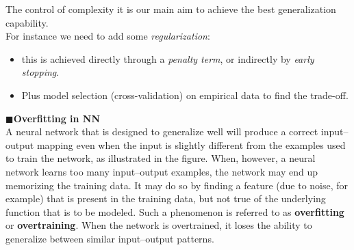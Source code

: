 \documentclass[../main.tex]{subfiles}
\begin{document}
\noindent The control of complexity it is our main aim to achieve the best generalization capability.\\
For instance we need to add some \emph{regularization}:
\begin{itemize}
    \item this is achieved directly through a \emph{penalty term}, or indirectly by \emph{early stopping}.
    \item Plus model selection (cross-validation) on empirical data to find the trade-off.
\end{itemize}

\noindent$\blacksquare$\textbf{Overfitting in NN}\\
\noindent A neural network that is designed to generalize well will produce a correct
input–output mapping even when the input is slightly different from the examples used
to train the network, as illustrated in the figure. When, however, a neural network learns too many input–output examples, the network may end up memorizing the training
data. It may do so by finding a feature (due to noise, for example) that is present in the training data, but not true of the underlying function that is to be modeled. Such a phenomenon is referred to as \textbf{overfitting} or \textbf{overtraining}. When the network is overtrained, it loses the ability to generalize between similar input–output patterns.\\
\end{document}
